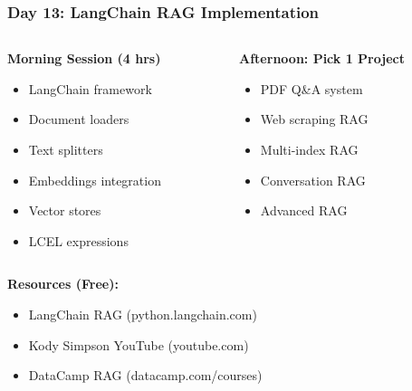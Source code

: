 \begin{frame}[fragile]\frametitle{Day 13: LangChain RAG Implementation}
\begin{columns}
    \begin{column}[T]{0.5\linewidth}
      \textbf{Morning Session (4 hrs)}
      \begin{itemize}
        \item LangChain framework
        \item Document loaders
        \item Text splitters
        \item Embeddings integration
        \item Vector stores
        \item LCEL expressions
      \end{itemize}
    \end{column}
    \begin{column}[T]{0.5\linewidth}
      \textbf{Afternoon: Pick 1 Project}
      \begin{itemize}
        \item PDF Q\&A system
        \item Web scraping RAG
        \item Multi-index RAG
        \item Conversation RAG
        \item Advanced RAG
      \end{itemize}
    \end{column}
  \end{columns}
  
  \vspace{0.3cm}
  \textbf{Resources (Free):}
  \begin{itemize}
    \item LangChain RAG (python.langchain.com)
    \item Kody Simpson YouTube (youtube.com)
    \item DataCamp RAG (datacamp.com/courses)
  \end{itemize}
\end{frame}

